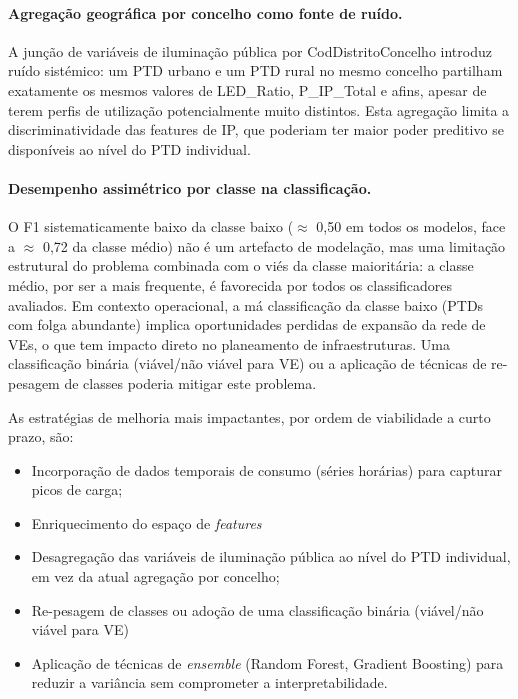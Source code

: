 \documentclass[conference]{IEEEtran}
\begin{document}
\paragraph{Agregação geográfica por concelho como fonte de ruído.} A junção de variáveis de iluminação pública por CodDistritoConcelho introduz ruído sistémico: um PTD urbano e um PTD rural no mesmo concelho partilham exatamente os mesmos valores de LED\_Ratio, P\_IP\_Total e afins, apesar de terem perfis de utilização potencialmente muito distintos. Esta agregação limita a discriminatividade das features de IP, que poderiam ter maior poder preditivo se disponíveis ao nível do PTD individual.

\paragraph{Desempenho assimétrico por classe na classificação.} O F1 sistematicamente baixo da classe baixo ($\approx$ 0,50 em todos os modelos, face a $\approx$ 0,72 da classe médio) não é um artefacto de modelação, mas uma limitação estrutural do problema combinada com o viés da classe maioritária: a classe médio, por ser a mais frequente, é favorecida por todos os classificadores avaliados. Em contexto operacional, a má classificação da classe baixo (PTDs com folga abundante) implica oportunidades perdidas de expansão da rede de VEs, o que tem impacto direto no planeamento de infraestruturas. Uma classificação binária (viável/não viável para VE) ou a aplicação de técnicas de re-pesagem de classes poderia mitigar este problema.

As estratégias de melhoria mais impactantes, por ordem de viabilidade a curto prazo, são:
\begin{itemize}
    \item Incorporação de dados temporais de consumo (séries horárias) para capturar picos de carga;
    \item Enriquecimento do espaço de \textit{features}
    \item Desagregação das variáveis de iluminação pública ao nível do PTD individual, em vez da atual agregação por concelho;
    \item Re-pesagem de classes ou adoção de uma classificação binária (viável/não viável para VE)
    \item Aplicação de técnicas de \textit{ensemble} (Random Forest, Gradient Boosting) para reduzir a variância sem comprometer a interpretabilidade.
\end{itemize}
\end{document}
